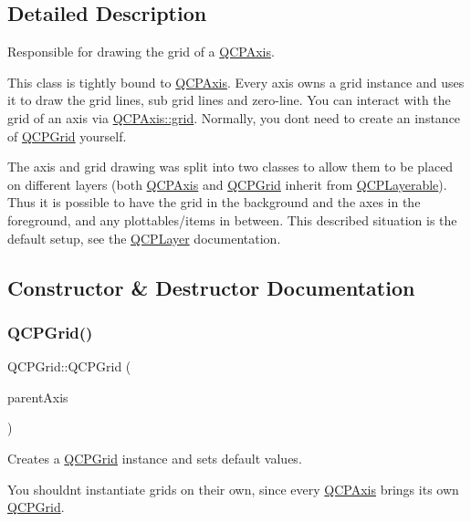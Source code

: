 \subsection{Detailed Description}
Responsible for drawing the grid of a \hyperlink{class_q_c_p_axis}{Q\+C\+P\+Axis}. 

This class is tightly bound to \hyperlink{class_q_c_p_axis}{Q\+C\+P\+Axis}. Every axis owns a grid instance and uses it to draw the grid lines, sub grid lines and zero-\/line. You can interact with the grid of an axis via \hyperlink{class_q_c_p_axis_a63f1dd2df663680d2a8d06c19592dd63}{Q\+C\+P\+Axis\+::grid}. Normally, you don\textquotesingle{}t need to create an instance of \hyperlink{class_q_c_p_grid}{Q\+C\+P\+Grid} yourself.

The axis and grid drawing was split into two classes to allow them to be placed on different layers (both \hyperlink{class_q_c_p_axis}{Q\+C\+P\+Axis} and \hyperlink{class_q_c_p_grid}{Q\+C\+P\+Grid} inherit from \hyperlink{class_q_c_p_layerable}{Q\+C\+P\+Layerable}). Thus it is possible to have the grid in the background and the axes in the foreground, and any plottables/items in between. This described situation is the default setup, see the \hyperlink{class_q_c_p_layer}{Q\+C\+P\+Layer} documentation. 

\subsection{Constructor \& Destructor Documentation}
\mbox{\label{class_q_c_p_grid_acd1cdd2909625388a13048b698494a17}} 
\subsubsection{\texorpdfstring{Q\+C\+P\+Grid()}{QCPGrid()}}
{\footnotesize\ttfamily Q\+C\+P\+Grid\+::\+Q\+C\+P\+Grid (\begin{DoxyParamCaption}\item[{\hyperlink{class_q_c_p_axis}{Q\+C\+P\+Axis} $\ast$}]{parent\+Axis }\end{DoxyParamCaption})\hspace{0.3cm}{\ttfamily [explicit]}}

Creates a \hyperlink{class_q_c_p_grid}{Q\+C\+P\+Grid} instance and sets default values.

You shouldn\textquotesingle{}t instantiate grids on their own, since every \hyperlink{class_q_c_p_axis}{Q\+C\+P\+Axis} brings its own \hyperlink{class_q_c_p_grid}{Q\+C\+P\+Grid}. 

